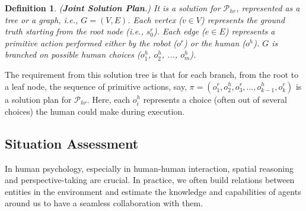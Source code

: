 \documentclass[letterpaper]{article} %
\newtheorem{definition}{Definition}
\begin{document}

\begin{definition}
(\textbf{Joint Solution Plan}.) 
It is a solution for $\mathcal{P}_{hr}$, represented as a tree or a graph, i.e., $G=(V,E)$. Each vertex ($v \in V$) represents {\em the ground truth} starting from the root node (i.e., $s_0^r$). 
Each edge ($e \in E$) represents a primitive action performed either by the robot ($o^r$) or the human ($o^h$). 
$G$ is branched on possible human choices ($o^{h}_1$, $o^{h}_2$, ..., $o^{h}_m$). 
\label{def:hatp-joint-sol-plan}
\end{definition}

The requirement from this solution tree is that for each branch, from the root to a leaf node, the sequence of primitive actions, say, $\pi=(o^r_1, o^h_2,o^r_3,...,o^h_{k-1},o^r_k)$ is a solution plan for $\mathcal{P}_{hr}$. Here, each $o_i^h$ represents a choice (often out of several choices) the human could make during execution.


\subsection{Situation Assessment} 
In human psychology, especially in human-human interaction, spatial reasoning and perspective-taking are crucial. 
In practice, we often build relations between 
entities in the environment and estimate the knowledge and capabilities of agents around us to have a seamless collaboration with them.
\end{document}
